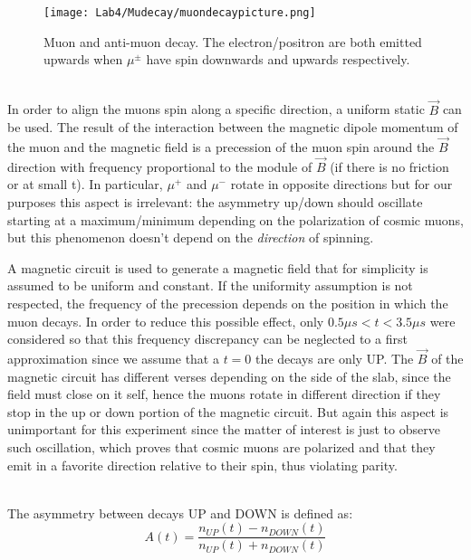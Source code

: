 \documentclass[10pt,a4paper,twocolumn]{article}
\begin{document}
\begin{figure}[h!]
\centering
\texttt{[image: Lab4/Mudecay/muondecaypicture.png]} 
\caption{Muon and anti-muon decay. The electron/positron are both emitted upwards when $\mu^\pm$ have spin downwards and upwards respectively.}
\label{mudecay}
\end{figure}

\\
In order to align the muons spin along a specific direction, a uniform static $\vec{B}$ can be used. The result of the interaction between the magnetic dipole momentum of the muon and the magnetic field is a precession of the muon spin around the $\vec{B}$ direction with frequency proportional to the module of $\vec{B}$ (if there is no friction or at small t).  In particular, $\mu^+$ and $\mu^-$ rotate in opposite directions but for our purposes this aspect is irrelevant: the asymmetry up/down should oscillate starting at a maximum/minimum depending on the polarization of cosmic muons, but this phenomenon doesn't depend on the \textit{direction} of spinning.


A magnetic circuit is used to generate a magnetic field that for simplicity is assumed to be uniform and constant. If the uniformity assumption is not respected, the frequency of the precession depends on the position in which the muon decays. In order to reduce this possible effect, only $0.5 \mu s <t < 3.5 \mu s$ were considered so that this frequency discrepancy can be neglected to a first approximation since we assume that a $t=0$ the decays are only UP. The $\vec{B}$ of the magnetic circuit has different verses depending on the side of the slab, since the field must close on it self, hence the muons rotate in different direction if they stop in the up or down portion of the magnetic circuit. But again this aspect is unimportant for this experiment since the matter of interest is just to observe such oscillation, which proves that cosmic muons are polarized and that they emit in a favorite direction relative to their spin, thus violating parity.

\\
The asymmetry between decays UP and DOWN is defined as:
\begin{equation}
\label{asym}
    A(t) = \frac{n_{UP}(t)-n_{DOWN}(t)}{n_{UP}(t)+n_{DOWN}(t)}
\end{equation}
\end{document}
